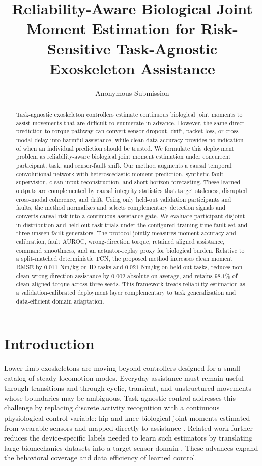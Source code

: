 \documentclass[letterpaper]{article} %
\title{Reliability-Aware Biological Joint Moment Estimation for Risk-Sensitive Task-Agnostic Exoskeleton Assistance}
\author{Anonymous Submission}
\begin{document}
\maketitle

\begin{abstract}
Task-agnostic exoskeleton controllers estimate continuous biological joint moments to assist movements that are difficult to enumerate in advance.
However, the same direct prediction-to-torque pathway can convert sensor dropout, drift, packet loss, or cross-modal delay into harmful assistance, while clean-data accuracy provides no indication of when an individual prediction should be trusted.
We formulate this deployment problem as reliability-aware biological joint moment estimation under concurrent participant, task, and sensor-fault shift.
Our method augments a causal temporal convolutional network with heteroscedastic moment prediction, synthetic fault supervision, clean-input reconstruction, and short-horizon forecasting.
These learned outputs are complemented by causal integrity statistics that target staleness, disrupted cross-modal coherence, and drift.
Using only held-out validation participants and faults, the method normalizes and selects complementary detection signals and converts causal risk into a continuous assistance gate.
We evaluate participant-disjoint in-distribution and held-out-task trials under the configured training-time fault set and three unseen fault generators.
The protocol jointly measures moment accuracy and calibration, fault AUROC, wrong-direction torque, retained aligned assistance, command smoothness, and an actuator-replay proxy for biological burden.
Relative to a split-matched deterministic TCN, the proposed method increases clean moment RMSE by $0.011$ Nm/kg on ID tasks and $0.021$ Nm/kg on held-out tasks, reduces non-clean wrong-direction assistance by $0.002$ absolute on average, and retains $98.1\%$ of clean aligned torque across three seeds.
This framework treats reliability estimation as a validation-calibrated deployment layer complementary to task generalization and data-efficient domain adaptation.
\end{abstract}

\section{Introduction}

Lower-limb exoskeletons are moving beyond controllers designed for a small catalog of steady locomotion modes.
Everyday assistance must remain useful through transitions and through cyclic, transient, and unstructured movements whose boundaries may be ambiguous.
Task-agnostic control addresses this challenge by replacing discrete activity recognition with a continuous physiological control variable: hip and knee biological joint moments estimated from wearable sensors and mapped directly to assistance \citep{molinaro2024task}.
Related work further reduces the device-specific labels needed to learn such estimators by translating large biomechanics datasets into a target sensor domain \citep{scherpereel2025domain}.
These advances expand the behavioral coverage and data efficiency of learned control.
\end{document}
